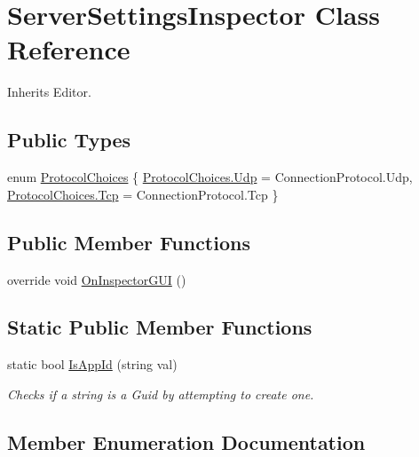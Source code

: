 \hypertarget{class_server_settings_inspector}{}\section{Server\+Settings\+Inspector Class Reference}
\label{class_server_settings_inspector}


Inherits Editor.

\subsection*{Public Types}
\begin{DoxyCompactItemize}
\item 
enum \hyperlink{class_server_settings_inspector_a926f762456cae88ef59d1b1a948e9ff0}{Protocol\+Choices} \{ \hyperlink{class_server_settings_inspector_a926f762456cae88ef59d1b1a948e9ff0a81baba40274ccb30f9fdfa2c73cf0482}{Protocol\+Choices.\+Udp} = Connection\+Protocol.\+Udp, 
\hyperlink{class_server_settings_inspector_a926f762456cae88ef59d1b1a948e9ff0a30b7fdeebc36988717d0e274cc2e7520}{Protocol\+Choices.\+Tcp} = Connection\+Protocol.\+Tcp
 \}
\end{DoxyCompactItemize}
\subsection*{Public Member Functions}
\begin{DoxyCompactItemize}
\item 
override void \hyperlink{class_server_settings_inspector_a8700b5c9f2191179a4eb9af443e8297d}{On\+Inspector\+G\+UI} ()
\end{DoxyCompactItemize}
\subsection*{Static Public Member Functions}
\begin{DoxyCompactItemize}
\item 
static bool \hyperlink{class_server_settings_inspector_a6741c24491cc0260e444d05629ff4871}{Is\+App\+Id} (string val)
\begin{DoxyCompactList}\small\item\em Checks if a string is a Guid by attempting to create one. \end{DoxyCompactList}\end{DoxyCompactItemize}


\subsection{Member Enumeration Documentation}
